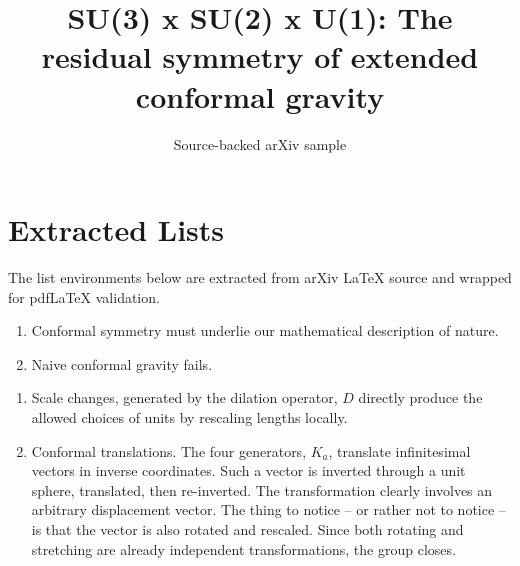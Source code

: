 \documentclass[11pt]{article}
\title{SU(3) x SU(2) x U(1): The residual symmetry of extended conformal
  gravity}
\author{Source-backed arXiv sample}
\date{}
\begin{document}
\maketitle
\section{Extracted Lists}

The list environments below are extracted from arXiv LaTeX source and wrapped for pdfLaTeX validation.

\begin{enumerate}
         \item Conformal symmetry must underlie our mathematical
                    description of nature.
         \item Naive conformal gravity fails.
     \end{enumerate}

\begin{enumerate}
              \item Scale changes, generated by the dilation operator, $D$
directly produce the allowed choices of units by rescaling lengths locally.
              \item Conformal translations.  The four generators, $K_{a}$,
translate infinitesimal vectors in inverse coordinates.  Such a vector is
inverted through a unit sphere, translated, then re-inverted.  The
transformation clearly involves an arbitrary displacement vector.  The thing to
notice -- or rather not to notice -- is that the vector is also rotated and
rescaled.  Since both rotating and stretching are already independent
transformations, the group closes.
          \end{enumerate}
\end{document}
